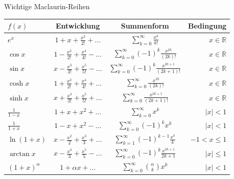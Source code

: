 \begin{minipage}{\linewidth}
\Tab Wichtige Maclaurin-Reihen

\begin{tabular}{l c c r}
    $f(x)$ & Entwicklung & Summenform & Bedingung \\
    \hline
    $e^x$ & $1 + x + \frac{x^2}{2!} + \dots$ & $\sum_{k=0}^\infty \frac{x^k}{k!}$ & $x \in \mathbb{R}$ \\[1ex]
    $\cos x$ & $1 - \frac{x^2}{2!} + \frac{x^4}{4!} - \dots$ & $\sum_{k=0}^\infty (-1)^k \frac{x^{2k}}{(2k)!}$ & $x \in \mathbb{R}$ \\[1ex]
    $\sin x$ & $x - \frac{x^3}{3!} + \frac{x^5}{5!} - \dots$ & $\sum_{k=0}^\infty (-1)^k \frac{x^{2k+1}}{(2k+1)!}$ & $x \in \mathbb{R}$ \\[1ex]
    $\cosh x$ & $1 + \frac{x^2}{2!} + \frac{x^4}{4!} + \dots$ & $\sum_{k=0}^\infty \frac{x^{2k}}{(2k)!}$ & $x \in \mathbb{R}$ \\[1ex]
    $\sinh x$ & $x + \frac{x^3}{3!} + \frac{x^5}{5!} + \dots$ & $\sum_{k=0}^\infty \frac{x^{2k+1}}{(2k+1)!}$ & $x \in \mathbb{R}$ \\[1ex]
    \hline
    $\frac{1}{1-x}$ & $1 + x + x^2 + \dots$ & $\sum_{k=0}^\infty x^k$ & $|x| < 1$ \\[1ex]
    $\frac{1}{1+x}$ & $1 - x + x^2 - \dots$ & $\sum_{k=0}^\infty (-1)^k x^k$ & $|x| < 1$ \\[1ex]
    $\ln(1+x)$ & $x - \frac{x^2}{2} + \frac{x^3}{3} + \dots$ & $\sum_{k=1}^\infty (-1)^{k-1} \frac{x^k}{k}$ & $-1 < x \le 1$ \\[1ex]
    $\arctan x$ & $x - \frac{x^3}{3} + \frac{x^5}{5} - \dots$ & $\sum_{k=0}^\infty (-1)^k \frac{x^{2k+1}}{2k+1}$ & $|x| \le 1$ \\[1ex]
    $(1+x)^\alpha$ & $1 + \alpha x + \dots$ & $\sum_{k=0}^\infty \binom{\alpha}{k} x^k$ & $|x| < 1$ \\
\end{tabular}
\end{minipage}

